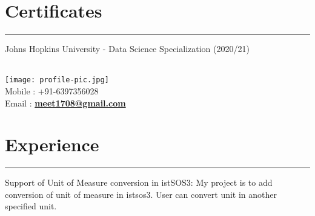 \documentclass[]{meetresume-class}
\begin{document}
\begin{minipage}[t]{0.33\textwidth}
		\section{Certificates}
		\noindent\rule{5cm}{0.6pt}
		
		Johns Hopkins University - Data Science Specialization (2020/21)\\
		
	\end{minipage} 
	\hfill
	\begin{minipage}[t]{0.66\textwidth} 
		\hspace*{0pt}\hfill    \\
		\hspace*{0pt}\hfill \texttt{[image: profile-pic.jpg]}\\
		\hspace*{0pt}\hfill Mobile : +91-6397356028 \\
		\hspace*{0pt}\hfill Email : \textbf{\href{mailto:meet1708@gmail.com}{meet1708@gmail.com}}
		\section{Experience}
		\noindent\rule{12.5cm}{0.4pt}
		 
		\noindent
		\hspace{5em}%
		\begin{minipage}{0.85\textwidth\vspace{2pt}}
			Support of Unit of Measure conversion in istSOS3: My project is to add conversion of
			unit of measure in istsos3. User can convert unit in another specified unit.
		\end{minipage}
		\sectionsep
		

\end{minipage}
\end{document}
